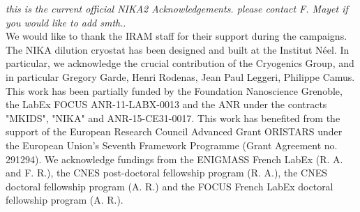 \documentclass[]{aa} %
\begin{document}
\begin{acknowledgements}
{\it this is the current official NIKA2 Acknowledgements. please contact F.
Mayet if you would like to add smth.}.\\
We would like to thank the IRAM staff for their support during the campaigns. 
The NIKA dilution cryostat has been designed and built at the Institut N\'eel. 
In particular, we acknowledge the crucial contribution of the Cryogenics Group, and 
in particular Gregory Garde, Henri Rodenas, Jean Paul Leggeri, Philippe Camus. 
This work has been partially funded by the Foundation Nanoscience Grenoble, the LabEx FOCUS ANR-11-LABX-0013 and 
the ANR under the contracts "MKIDS", "NIKA" and ANR-15-CE31-0017. 
This work has benefited from the support of the European Research Council Advanced Grant ORISTARS 
under the European Union's Seventh Framework Programme (Grant Agreement no. 291294).
We acknowledge fundings from the ENIGMASS French LabEx (R. A. and F. R.), 
the CNES post-doctoral fellowship program (R. A.),  the CNES doctoral fellowship program (A. R.) and 
the FOCUS French LabEx doctoral fellowship program (A. R.).


\end{acknowledgements}
\end{document}
